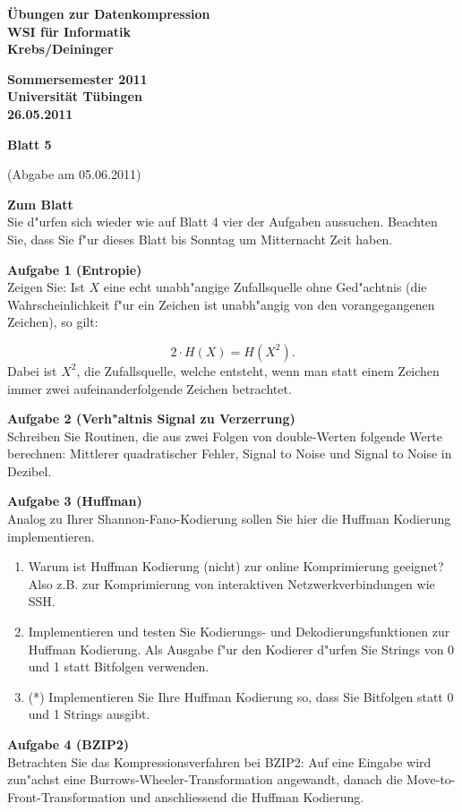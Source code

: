 \documentclass[a4paper]{article}
\def\header#1#2#3#4{\pagestyle{empty}
\noindent
\begin{minipage}[t]{0.6\textwidth}
\begin{flushleft}
\bf \"Ubungen zur Datenkompression\\
WSI f\"ur Informatik\\
Krebs/Deininger
\end{flushleft}
\end{minipage}
\begin{minipage}[t]{0.4\textwidth}
\begin{flushright}
\bf Sommersemester 2011\\
Universit\"at T\"ubingen\\
#2 %
\end{flushright}
\end{minipage}

\begin{center}
{\Large\bf Blatt #1}

{(Abgabe am #3)}
\end{center}
}
\begin{document}
\header{5}{26.05.2011}{05.06.2011}{}

\bigskip
{\bf Zum Blatt}\\
Sie d"urfen sich wieder wie auf Blatt 4 vier der Aufgaben aussuchen. Beachten
Sie, dass Sie f"ur dieses Blatt bis Sonntag um Mitternacht Zeit haben.

\bigskip

{\bf Aufgabe 1  \quad(Entropie)}\\
Zeigen Sie: Ist $X$ eine echt unabh"angige Zufallsquelle ohne Ged"achtnis (die
Wahrscheinlichkeit f"ur ein Zeichen ist unabh"angig von den vorangegangenen
Zeichen), so gilt:

$$2\cdot H(X)= H(X^2).$$
Dabei ist $X^2$, die Zufallsquelle, welche entsteht, wenn man statt einem
Zeichen immer zwei aufeinanderfolgende Zeichen betrachtet.

\bigskip

{\bf Aufgabe 2  \quad(Verh"altnis Signal zu Verzerrung)}\\
Schreiben Sie Routinen, die aus zwei Folgen von {\rm double}-Werten folgende
Werte berechnen: Mittlerer quadratischer Fehler, Signal to Noise und Signal to
Noise in Dezibel.

\bigskip

{\bf Aufgabe 3  \quad(Huffman)}\\
Analog zu Ihrer Shannon-Fano-Kodierung sollen Sie hier die Huffman Kodierung
implementieren.
\begin{enumerate}
\item Warum ist Huffman Kodierung (nicht) zur online Komprimierung geeignet?
      Also z.B. zur Komprimierung von interaktiven Netzwerkverbindungen wie SSH.
\item Implementieren und testen Sie Kodierungs- und Dekodierungsfunktionen zur
      Huffman Kodierung. Als Ausgabe f"ur den Kodierer d"urfen Sie Strings von
      0 und 1 statt Bitfolgen verwenden.
\item(*) Implementieren Sie Ihre Huffman Kodierung so, dass Sie Bitfolgen statt
      0 und 1 Strings ausgibt.
\end{enumerate}

\bigskip

{\bf Aufgabe 4  \quad(BZIP2)}\\
Betrachten Sie das Kompressionsverfahren bei BZIP2: Auf eine Eingabe wird
zun"achst eine Burrows-Wheeler-Transformation angewandt, danach die
Move-to-Front-Transformation und anschliessend die Huffman Kodierung.
\end{document}
